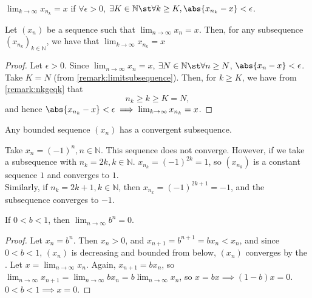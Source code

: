 \documentclass[12pt]{article}
\begin{document}
\begin{remark}\label{remark:limitsubsequence}
  $\lim_{k\to\infty}x_{n_k} = x$ if $\forall \epsilon > 0$, $\exists K \in \mathbb{N} \st \forall k \geq K, \abs{x_{n_k} - x} < \epsilon$.
\end{remark}


\begin{theorem}\label{thm:convsubsequence}
  Let $(x_n)$ be a sequence such that $\lim_{n\to\infty} x_n = x$. Then, for any subsequence $(x_{n_k})_{k\in\mathbb{N}}$, we have that $\lim_{k\to\infty} x_{n_k} = x$
\end{theorem}
\begin{proof}
  Let $\epsilon > 0$. Since $\lim_{n\to\infty} x_{n} = x$, $\exists N \in \mathbb{N} \st \forall n \geq N$, $\abs{x_n - x} < \epsilon$. Take $K = N$ (from \cref{remark:limitsubsequence}). Then, for $k \geq K$, we have from \cref{remark:nkgeqk} that $$n_k \geq k \geq K = N,$$ and hence $\abs{x_{n_k} - x} < \epsilon \implies \lim_{k\to\infty}x_{n_k} = x$.
\end{proof}

\begin{theorem}\label{thm:bwthm}\footnotemark
  Any bounded sequence $(x_n)$ has a convergent subsequence.  
  \end{theorem}
\begin{example}
  Take $x_n = (-1)^n, n \in\mathbb{N}$. This sequence does not converge. However, if we take a subsequence with $n_k =2k, k \in\mathbb{N}$. $x_{n_k} = (-1)^{2k} = 1$, so $(x_{n_k})$ is a constant sequence $1$ and converges to $1$.\\ Similarly, if $n_k = 2k+1, k \in \mathbb{N}$, then $x_{n_k} = (-1)^{2k+1} = -1$, and the subsequence converges to $-1$.
\end{example}  

\begin{proposition}\label{prop:prelimfact}
  If $0 < b < 1$, then $\lim_{n\to\infty}b^{n} = 0$.
\end{proposition}
\begin{proof}
  Let $x_n = b^n$. Then $x_n > 0$, and $x_{n+1} = b^{n+1} = b x_{n} < x_n$, and since $ 0 < b < 1$, $(x_n)$ is decreasing and bounded from below, $(x_n)$ converges by the . Let $x = \lim_{n\to\infty}x_n$. Again, $x_{n+1} = b x_n$, so $\lim_{n\to\infty}x_{n+1} = \lim_{n\to\infty}bx_{n} = b\lim_{n\to\infty}x_n$, so $x = bx \implies (1-b)x = 0$. $0 < b < 1 \implies x = 0$.
\end{proof}
\end{document}
